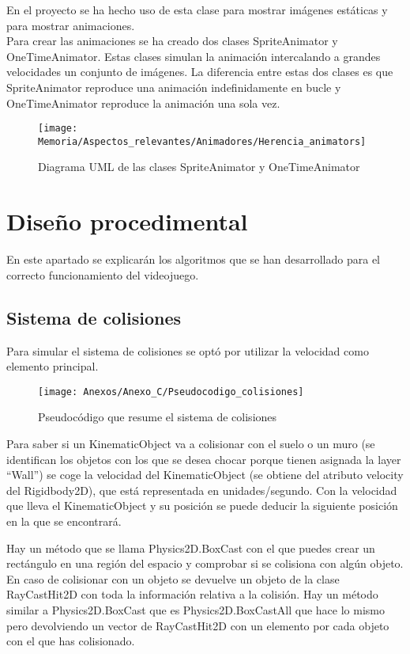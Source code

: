 En el proyecto se ha hecho uso de esta clase para mostrar imágenes estáticas y para mostrar animaciones.\\
Para crear las animaciones se ha creado dos clases SpriteAnimator y OneTimeAnimator. Estas clases simulan la animación intercalando a grandes velocidades un conjunto de imágenes. La diferencia entre estas dos clases es que SpriteAnimator reproduce una animación indefinidamente en bucle y OneTimeAnimator reproduce la animación una sola vez.

\begin{figure}[h]
\texttt{[image: Memoria/Aspectos\_relevantes/Animadores/Herencia\_animators]}
\caption{Diagrama UML de las clases SpriteAnimator y OneTimeAnimator}
\end{figure}

\section{Diseño procedimental}
En este apartado se explicarán los algoritmos que se han desarrollado para el correcto funcionamiento del videojuego.

\subsection{Sistema de colisiones}
Para simular el sistema de colisiones se optó por utilizar la velocidad como elemento principal.

\clearpage
\begin{figure}[h]
\centering
\texttt{[image: Anexos/Anexo\_C/Pseudocodigo\_colisiones]}
\caption{Pseudocódigo que resume el sistema de colisiones}
\end{figure}

Para saber si un KinematicObject va a colisionar con el suelo o un muro (se identifican los objetos con los que se desea chocar porque tienen asignada la layer “Wall”) se coge la velocidad del KinematicObject (se obtiene del atributo velocity del Rigidbody2D), que está representada en unidades/segundo. Con la velocidad que lleva el KinematicObject y su posición se puede deducir la siguiente posición en la que se encontrará.

Hay un método que se llama Physics2D.BoxCast con el que puedes crear un rectángulo en una región del espacio y comprobar si se colisiona con algún objeto. En caso de colisionar con un objeto se devuelve un objeto de la clase RayCastHit2D con toda la información relativa a la colisión. Hay un método similar a Physics2D.BoxCast que es Physics2D.BoxCastAll que hace lo mismo pero devolviendo un vector de RayCastHit2D con un elemento por cada objeto con el que has colisionado.

